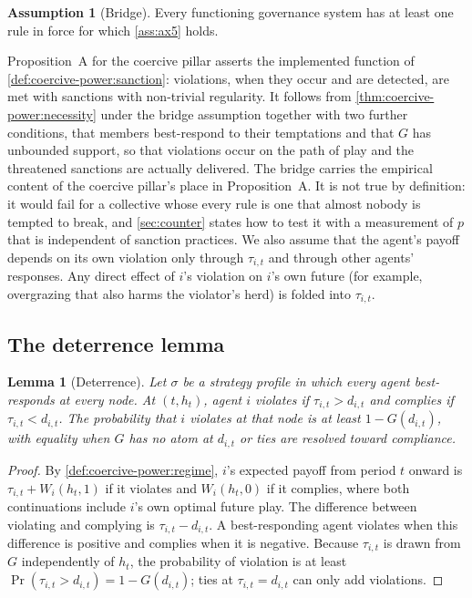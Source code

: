 \documentclass[11pt,letterpaper]{article}
\newtheorem{lemma}[theorem]{Lemma}
\theoremstyle{definition}
\newtheorem{assumption}[theorem]{Assumption}
\theoremstyle{remark}
\renewcommand{\Pr}{\operatorname{Pr}}
\begin{document}
\begin{assumption}[Bridge]
\label{ass:bridge}
Every functioning governance system has at least one rule in force for which \cref{ass:ax5} holds.
\end{assumption}

Proposition~A for the coercive pillar asserts the implemented function of \cref{def:coercive-power:sanction}: violations, when they occur and are detected, are met with sanctions with non-trivial regularity. It follows from \cref{thm:coercive-power:necessity} under the bridge assumption together with two further conditions, that members best-respond to their temptations and that $G$ has unbounded support, so that violations occur on the path of play and the threatened sanctions are actually delivered. The bridge carries the empirical content of the coercive pillar's place in Proposition~A. It is not true by definition: it would fail for a collective whose every rule is one that almost nobody is tempted to break, and \cref{sec:counter} states how to test it with a measurement of $p$ that is independent of sanction practices. We also assume that the agent's payoff depends on its own violation only through $\tau_{i,t}$ and through other agents' responses. Any direct effect of $i$'s violation on $i$'s own future (for example, overgrazing that also harms the violator's herd) is folded into $\tau_{i,t}$.

\subsection{The deterrence lemma}

\begin{lemma}[Deterrence]
\label{lem:coercive-power:deterrence}
Let $\sigma$ be a strategy profile in which every agent best-responds at every node. At $(t, h_t)$, agent $i$ violates if $\tau_{i,t} > d_{i,t}$ and complies if $\tau_{i,t} < d_{i,t}$. The probability that $i$ violates at that node is at least $1 - G(d_{i,t})$, with equality when $G$ has no atom at $d_{i,t}$ or ties are resolved toward compliance.
\end{lemma}

\begin{proof}
By \cref{def:coercive-power:regime}, $i$'s expected payoff from period $t$ onward is $\tau_{i,t} + W_i(h_t,1)$ if it violates and $W_i(h_t,0)$ if it complies, where both continuations include $i$'s own optimal future play. The difference between violating and complying is $\tau_{i,t} - d_{i,t}$. A best-responding agent violates when this difference is positive and complies when it is negative. Because $\tau_{i,t}$ is drawn from $G$ independently of $h_t$, the probability of violation is at least $\Pr(\tau_{i,t} > d_{i,t}) = 1 - G(d_{i,t})$; ties at $\tau_{i,t} = d_{i,t}$ can only add violations.
\end{proof}
\end{document}
